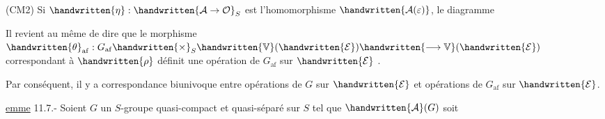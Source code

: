 (CM2) Si $\handwritten{\eta}:\handwritten{\mathcal{A}\to\mathcal{O}}_S$ est l'homomorphisme $\handwritten{\mathcal{A}(\varepsilon)}$, le diagramme

Il revient au même de dire que le morphisme $\handwritten{\theta}_{\mathrm{af}}:G_{\mathrm{af}}\handwritten{\times}_S\handwritten{\mathbb{V}}(\handwritten{\mathcal{E}})\handwritten{\longrightarrow\mathbb{V}}(\handwritten{\mathcal{E}})$ correspondant à $\handwritten{\rho}$ définit une opération de $G_{\mathrm{af}}$ sur $\handwritten{\mathcal{E}}$  .

Par conséquent, il y a correspondance biunivoque entre opérations de $G$ sur $\handwritten{\mathcal{E}}$ et opérations de $G_{\mathrm{af}}$ sur $\handwritten{\mathcal{E}}$.

\uline{emme} 11.7.- Soient $G$ un $S$-groupe quasi-compact et quasi-séparé sur $S$\handwritten{,} tel que $\handwritten{\mathcal{A}}(G)$ soit
